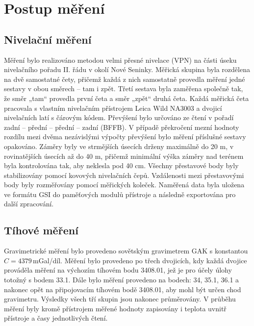 \section{Postup měření}

\subsection{Nivelační měření}

Měření bylo realizováno metodou velmi přesné nivelace (VPN) na části úseku nivelačního pořadu II. řádu v okolí Nové Seninky. Měřická skupina byla rozdělena na dvě samostatné čety, přičemž každá z nich samostatně provedla měření jedné sestavy v obou směrech – tam i zpět. Třetí sestava byla zaměřena společně tak, že směr „tam“ provedla první četa a směr „zpět“ druhá četa. Každá měřická četa pracovala s vlastním nivelačním přístrojem Leica Wild NA3003 a dvojicí nivelačních latí s čárovým kódem. Převýšení bylo určováno ze čtení v pořadí zadní – přední – přední – zadní (BFFB). V případě překročení mezní hodnoty rozdílu mezi dvěma nezávislými výpočty převýšení bylo měření příslušné sestavy opakováno. Záměry byly ve strmějších úsecích drženy maximálně do 20 m, v rovinatějších úsecích až do 40 m, přičemž minimální výška záměry nad terénem byla kontrolována tak, aby neklesla pod 40 cm. Všechny přestavové body byly stabilizovány pomocí kovových nivelačních čepů. Vzdálenosti mezi přestavovými body byly rozměřovány pomocí měřických koleček. Naměřená data byla uložena ve formátu GSI do paměťových modulů přístroje a následně exportována pro další zpracování.

\subsection{Tíhové měření}

Gravimetrické měření bylo provedeno sovětským gravimetrem GAK s konstantou $C = 4379\,$mGal/díl. Měření bylo provedeno po třech dvojicích, kdy každá dvojice prováděla měření na výchozím tíhovém bodu 3408.01, jež je pro účely úlohy totožný s bodem 33.1. Dále bylo měření provedeno na bodech: 34, 35.1, 36.1 a nakonec opět na připojovacím tíhovém bodě 3408.01, aby mohl být určen chod gravimetru. Výsledky všech tří skupin jsou nakonec průměrovány. V průběhu měření byly kromě přístrojem měřené hodnoty zapisovány i teplota uvnitř přístroje a časy jednotlivých čtení. 